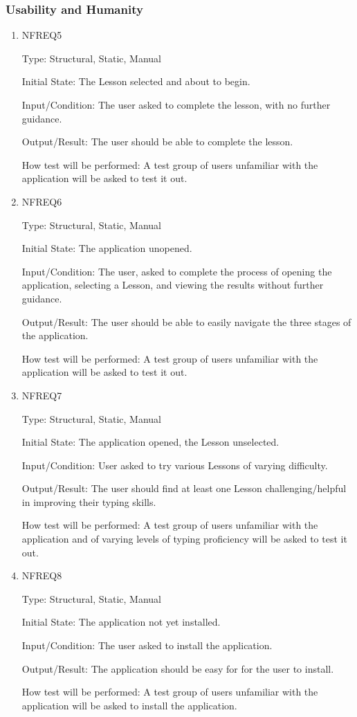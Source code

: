 \documentclass[12pt, titlepage]{article}
\begin{document}
\subsubsection{Usability and Humanity}
\begin{enumerate}

\item{NFREQ5\\}

Type: Structural, Static, Manual
					
Initial State: The Lesson selected and about to begin.
					
Input/Condition: The user asked to complete the lesson, with no further guidance.
					
Output/Result: The user should be able to complete the lesson.
					
How test will be performed: A test group of users unfamiliar with the application will be asked to test it out.

\item{NFREQ6\\}

Type: Structural, Static, Manual
					
Initial State: The application unopened.
					
Input/Condition: The user, asked to complete the process of opening the application, selecting a Lesson, and viewing the results without further guidance.
					
Output/Result: The user should be able to easily navigate the three stages of the application.
					
How test will be performed:  A test group of users unfamiliar with the application will be asked to test it out.

\item{NFREQ7\\}

Type: Structural, Static, Manual
					
Initial State: The application opened, the Lesson unselected.
					
Input/Condition: User asked to try various Lessons of varying difficulty.
					
Output/Result: The user should find at least one Lesson challenging/helpful in improving their typing skills.
					
How test will be performed:  A test group of users unfamiliar with the application and of varying levels of typing proficiency will be asked to test it out.

\item{NFREQ8\\}

Type: Structural, Static, Manual
					
Initial State: The application not yet installed.
					
Input/Condition: The user asked to install the application.
					
Output/Result: The application should be easy for for the user to install.
					
How test will be performed:  A test group of users unfamiliar with the application will be asked to install the application.

\end{enumerate}
\end{document}
